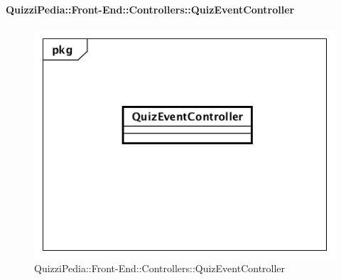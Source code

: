 \paragraph{QuizziPedia::Front-End::Controllers::QuizEventController}
\begin{figure} [ht]
	\centering
	\includegraphics[scale=0.45]{UML/Classi/Front-End/QuizziPedia_Front-end_Controller_QuizEventController.png}
	\caption{QuizziPedia::Front-End::Controllers::QuizEventController}
\end{figure} \FloatBarrier
